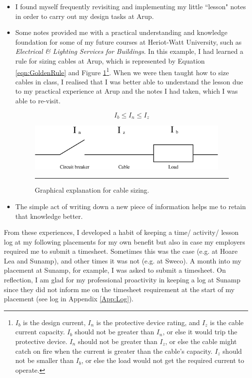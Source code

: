 \begin{itemize}
	\item I found myself frequently revisiting and implementing my little ``lesson" notes in order to carry out my design tasks at Arup.
	\item Some notes provided me with a practical understanding and knowledge foundation for some of my future courses at Heriot-Watt University, such as \textit{Electrical \& Lighting Services for Buildings}.
	In this example, I had learned a rule for sizing cables at Arup, which is represented by Equation \ref{eqn:GoldenRule} and Figure \ref{fig:GoldenRule}\footnote{
		$I_b$ is the design current, $I_n$ is the protective device rating, and $I_z$ is the cable current capacity.
		$I_b$ should not be greater than $I_n$, or else it would trip the protective device.
		$I_n$ should not be greater than $I_z$, or else the cable might catch on fire when the current is greater than the cable's capacity.
		$I_z$ should not be smaller than $I_b$, or else the load would not get the required current to operate.
	}.
	When we were then taught how to size cables in class, I realised that I was better able to understand the lesson due to my practical experience at Arup and the notes I had taken, which I was able to re-visit.
	
	\begin{equation}
	I_b \leq I_n \leq I_z
	\label{eqn:GoldenRule}
	\end{equation}
	
	\begin{figure}[H]
		\centering
		\includegraphics[width=10cm]{figures/GoldenRule.eps}
		\rule{10cm}{0.5pt} %
		\caption{Graphical explanation for cable sizing.}
		\label{fig:GoldenRule}
	\end{figure}
	
	\item The simple act of writing down a new piece of information helps me to retain that knowledge better.
\end{itemize}

From these experiences, I developed a habit of keeping a time/ activity/ lesson log at my following placements for my own benefit but also in case my employers required me to submit a timesheet.
Sometimes this was the case (e.g. at Hoare Lea and Sunamp), and other times it was not (e.g. at Sweco).
A month into my placement at Sunamp, for example, I was asked to submit a timesheet.
On reflection, I am glad for my professional proactivity in keeping a log at Sunamp since they did not inform me on the timesheet requirement at the start of my placement (see log in Appendix \ref{App:Log}).



